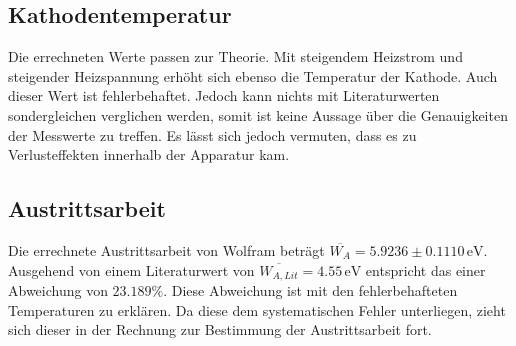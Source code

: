 \subsection{Kathodentemperatur}
Die errechneten Werte passen zur Theorie. Mit steigendem Heizstrom und steigender 
Heizspannung erhöht sich ebenso die Temperatur der Kathode. Auch dieser Wert 
ist fehlerbehaftet. Jedoch kann nichts mit Literaturwerten sondergleichen 
verglichen werden, somit ist keine Aussage über die Genauigkeiten der Messwerte 
zu treffen. Es lässt sich jedoch vermuten, dass es zu Verlusteffekten innerhalb 
der Apparatur kam. 

\subsection{Austrittsarbeit}
Die errechnete Austrittsarbeit von Wolfram beträgt $\overline{W_A} = 5.9236 \pm 0.1110 \, \unit{\electronvolt}$.
Ausgehend von einem Literaturwert von $\overline{W_{A,Lit}} = 4.55 \, \unit{\electronvolt}$ 
\cite{austrittsarbeitwolfram} entspricht das einer Abweichung von $23.189\%$.
Diese Abweichung ist mit den fehlerbehafteten Temperaturen zu erklären. Da diese 
dem systematischen Fehler unterliegen, zieht sich dieser in der Rechnung zur 
Bestimmung der Austrittsarbeit fort.
